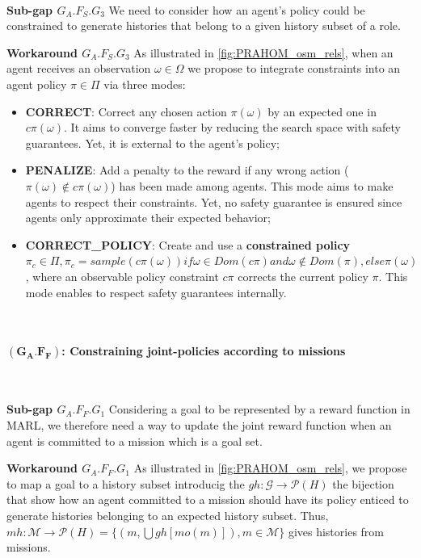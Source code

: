 \documentclass[runningheads]{llncs}
\begin{document}
\

\textbf{Sub-gap $G_A.F_S.G_3$} \quad We need to consider how an agent's policy could be constrained to generate histories that belong to a given history subset of a role.

\textbf{Workaround $G_A.F_S.G_3$} \quad As illustrated in \autoref{fig:PRAHOM_osm_rels}, when an agent receives an observation $\omega \in \Omega$ we propose to integrate constraints into an agent policy $\pi \in \Pi$ via three modes:
\begin{itemize}
    \item \textbf{CORRECT}: Correct any chosen action $\pi(\omega)$ by an expected one in $c\pi(\omega)$. It aims to converge faster by reducing the search space with safety guarantees. Yet, it is external to the agent's policy;
    \item \textbf{PENALIZE}: Add a penalty to the reward if any wrong action ($\pi(\omega) \notin c\pi(\omega)$) has been made among agents. This mode aims to make agents  to respect their constraints. Yet, no safety guarantee is ensured since agents only approximate their expected behavior;
    \item \textbf{CORRECT\_POLICY}: Create and use a \textbf{constrained policy} $\pi_c \in \Pi, \pi_c = {sample(c\pi(\omega)) if \omega \in Dom(c\pi) and \omega \notin Dom(\pi), else \pi(\omega)}$, where an observable policy constraint $c\pi$ corrects the current policy $\pi$. This mode enables to respect safety guarantees internally.
\end{itemize}

\

\paragraph{\textbf{$(\mathbf{G_A.F_F})$: Constraining joint-policies according to missions}}

\

\textbf{Sub-gap $G_A.F_F.G_1$} \quad Considering a goal to be represented by a reward function in MARL, we therefore need a way to update the joint reward function when an agent is committed to a mission which is a goal set.

\textbf{Workaround $G_A.F_F.G_1$} \quad As illustrated in \autoref{fig:PRAHOM_osm_rels}, we propose to map a goal to a history subset introducig the $gh: \mathcal{G} \rightarrow \mathcal{P}(H)$ the bijection that show how an agent committed to a mission should have its policy enticed to generate histories belonging to an expected history subset. Thus, $mh: \mathcal{M} \rightarrow \mathcal{P}(H) = \{(m,\bigcup gh[mo(m)]), m \in \mathcal{M}\}$ gives histories from missions.
\end{document}
